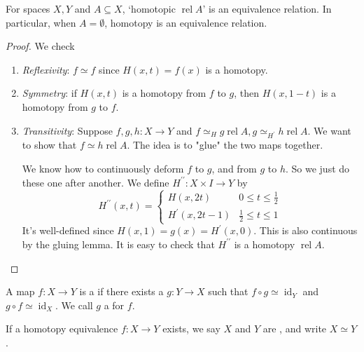 \documentclass[a4paper, 10pt, twocolumn]{amsart}
\newcommand{\id}{\operatorname{id}}
\newcommand{\rel}{\operatorname{rel}}
\begin{document}
\begin{proposition}
  For spaces $X, Y$ and $A \subseteq X$, `homotopic $\rel A$' is an equivalence relation. In particular, when $A = \emptyset$, homotopy is an equivalence relation.
\end{proposition}
\begin{proof}
  We check
  \begin{enumerate}
    \item \emph{Reflexivity}: $f \simeq f$ since $H(x, t)=f(x)$ is a homotopy.
    \item \emph{Symmetry}: if $H(x, t)$ is a homotopy from $f$ to $g$, then $H(x, 1-t)$ is a homotopy from $g$ to $f$.
    \item \emph{Transitivity}: Suppose $f, g, h: X \rightarrow Y$ and $f \simeq_H g \operatorname{rel} A, g \simeq_{H^{\prime}} h \operatorname{rel} A$. We want to show that $f \simeq h \operatorname{rel} A$. The idea is to "glue" the two maps together.
    
    We know how to continuously deform $f$ to $g$, and from $g$ to $h$. So we just do these one after another. We define $H^{\prime \prime}: X \times I \rightarrow Y$ by
    $$
    H^{\prime \prime}(x, t)= \begin{cases}H(x, 2 t) & 0 \leq t \leq \frac{1}{2} \\ H^{\prime}(x, 2 t-1) & \frac{1}{2} \leq t \leq 1\end{cases}
    $$
    It's well-defined since $H(x, 1)=g(x)=H^{\prime}(x, 0)$. This is also continuous by the gluing lemma. It is easy to check that $H^{\prime \prime}$ is a homotopy $\operatorname{rel} A$.
  \end{enumerate}
  \vspace{-1pc}
\end{proof}

\begin{definition}
  A map $f: X \rightarrow Y$ is a  if there exists a $g:Y \rightarrow X$ such that $f \circ g \simeq \id_Y$ and $g \circ f \simeq \id_X$. We call $g$ a  for $f$.

  If a homotopy equivalence $f: X \rightarrow Y$ exists, we say $X$ and $Y$ are , and write $X \simeq Y$.
\end{definition}
\end{document}
